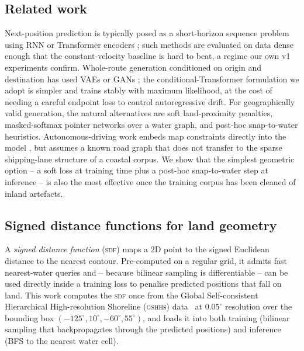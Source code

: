 \documentclass[oneside, a4paper, onecolumn, 11pt]{article}
\newcommand{\sdf}{\textsc{sdf}}
\begin{document}
\subsection{Related work}\label{sec:related}

Next-position prediction is typically posed as a short-horizon sequence
problem using RNN or Transformer encoders
\cite{nguyen2020transformer,capobianco2021lstm}; such methods are
evaluated on data dense enough that the constant-velocity baseline is
hard to beat, a regime our own v1 experiments confirm.  Whole-route
generation conditioned on origin and destination has used VAEs
\cite{liang2022generative} or GANs \cite{wang2019tggan}; the
conditional-Transformer formulation we adopt is simpler and trains
stably with maximum likelihood, at the cost of needing a careful
endpoint loss to control autoregressive drift.
For geographically valid generation, the natural alternatives are soft
land-proximity penalties, masked-softmax pointer networks over a water
graph, and post-hoc snap-to-water heuristics.  Autonomous-driving work
embeds map constraints directly into the model
\cite{salzmann2020trajectronpp}, but assumes a known road graph that
does not transfer to the sparse shipping-lane structure of a coastal
corpus.  We show that the simplest geometric option -- a soft loss at
training time plus a post-hoc snap-to-water step at inference -- is
also the most effective once the training corpus has been cleaned of
inland artefacts.

\subsection{Signed distance functions for land geometry}

A \emph{signed distance function} (\sdf) maps a 2D point to the signed
Euclidean distance to the nearest contour.  Pre-computed on a regular
grid, it admits fast nearest-water queries and -- because bilinear
sampling is differentiable -- can be used directly inside a training
loss to penalise predicted positions that fall on land.  This work
computes the \sdf{} once from the Global Self-consistent Hierarchical
High-resolution Shoreline (\textsc{gshhs})
data~\cite{wessel1996gshhs} at $0.05^\circ$ resolution over the
bounding box $(-125^\circ, 10^\circ, -60^\circ, 55^\circ)$, and loads
it into both training (bilinear sampling that backpropagates through
the predicted positions) and inference (BFS to the nearest water cell).

\end{document}

